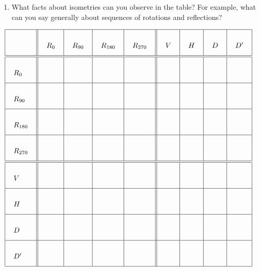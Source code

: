 \documentclass[handout]{ximera}
\begin{document}
\begin{problem}
\begin{enumerate}
\item What facts about isometries can you observe in the table?  For example, what can you say generally about sequences of rotations and reflections?  
\end{enumerate}
\[
{\arraycolsep=12pt\def\arraystretch{3}
\begin{array}{|l||l|l|l|l||l|l|l|l|}
\hline
 & R_0 & R_{90} & R_{180} & R_{270} & V & H & D & D' \\ \hline\hline
R_0 & & & & & & & & \\ \hline
R_{90} & & & & & & & & \\ \hline
R_{180} & & & & & & & & \\ \hline
R_{270} & & & & & & & & \\ \hline\hline
V & & & & & & & & \\ \hline
H & & & & & & & & \\ \hline
D & & & & & & & & \\ \hline
D' & & & & & & & & \\ \hline
\end{array}
}\]
\end{problem}

\end{document}
